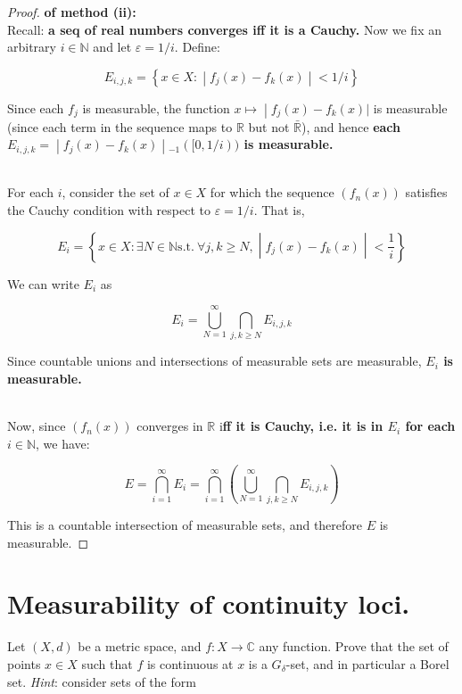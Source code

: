 \begin{proof}

\textbf{of method (ii):}\\
Recall: \textbf{a seq of real numbers converges iff it is a Cauchy.} Now we fix an arbitrary \(i \in \mathbb{N}\) and let \(\varepsilon = 1/i\). Define:

\[E_{i,j,k} = \left\{ x \in X: \middle| f_{j}(x) - f_{k}(x) \middle| < 1/i \right\}\]

Since each \(f_{j}\) is measurable, the function \(\left. x\mapsto \middle| f_{j}(x) - f_{k}(x)| \right.\) is measurable (since each term in the sequence maps to \(\mathbb{R}\) but not \(\bar{\mathbb{R}}\)), and hence \textbf{each \(\left. E_{i,j,k} = \middle| f_{j}(x) - f_{k}(x) \middle| {}_{- 1}(\lbrack 0,1/i)) \right.\) is measurable.}\\
\strut \\
For each \(i\), consider the set of \(x \in X\) for which the sequence \((f_{n}(x))\) satisfies the Cauchy condition with respect to \(\varepsilon = 1/i\). That is,

\[E_{i} = \left\{ x \in X:\exists N \in \mathbb{N}\text{s.t.}\ \forall j,k \geq N, \middle| f_{j}(x) - f_{k}(x) \middle| < \frac{1}{i} \right\}\]

We can write \(E_{i}\) as

\[E_{i} = \bigcup\limits_{N = 1}^{\infty}\bigcap\limits_{j,k \geq N}E_{i,j,k}\]

Since countable unions and intersections of measurable sets are measurable, \textbf{\(E_{i}\) is measurable.}\\
\strut \\
Now, since \((f_{n}(x))\) converges in \(\mathbb{R}\) i\textbf{ff it is Cauchy, i.e. it is in \(E_{i}\) for each \(i \in \mathbb{N}\)}, we have:

\[E = \bigcap\limits_{i = 1}^{\infty}E_{i} = \bigcap\limits_{i = 1}^{\infty}(\bigcup\limits_{N = 1}^{\infty}\bigcap\limits_{j,k \geq N}E_{i,j,k})\]

This is a countable intersection of measurable sets, and therefore \(E\) is measurable.

\end{proof}

\section{Measurability of continuity loci.}

Let \((X,d)\) be a metric space, and \(f:X\rightarrow\mathbb{C}\) any function. Prove that the set of points \(x \in X\) such that \(f\) is continuous at \(x\) is a \(G_{\delta}\)-set, and in particular a Borel set. \emph{Hint}: consider sets of the form

